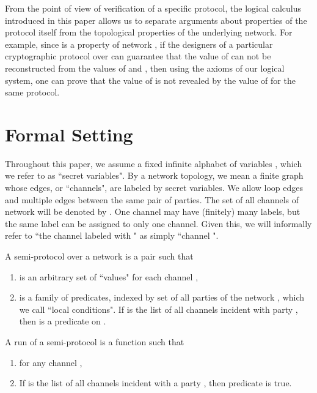 \documentclass{llncs}
\begin{document}
From the point of view of verification of a specific protocol, the logical calculus introduced in this paper allows us to separate arguments about properties of the protocol itself from the topological properties of the underlying network. For example, since  is a property of network , if the designers of a particular cryptographic protocol over  can guarantee that the value of  can not be reconstructed from the values of  and , then using the axioms of our logical system, one can prove that the value of  is not revealed by the value of  for the same protocol.


\section{Formal Setting}

Throughout this paper, we assume a fixed  infinite alphabet of variables , which we refer to as ``secret variables". By a network topology, we mean a finite graph whose edges, or ``channels", are labeled by secret variables.  We allow loop edges and multiple edges between the same pair of parties. The set of all channels of network  will be denoted by .  One channel may have (finitely) many labels, but the same label can be assigned to only one channel. Given this, we will informally refer to ``the channel labeled with " as simply ``channel ". 

\begin{definition}\label{}
A semi-protocol over a network  is a pair  such that
\begin{enumerate}
\item  is an arbitrary set of ``values" for each channel ,
\item  is a family of predicates, indexed by set  of all parties of the network , which we call ``local conditions".  If  is the list of all channels incident with party , then   is a predicate on .
\end{enumerate}
\end{definition}

\begin{definition}\label{}
A run of a semi-protocol  is a function  such that 
\begin{enumerate}
\item  for any channel , 
\item If  is the list of all channels incident with a party , then predicate  is true.
\end{enumerate}
\end{definition}
\end{document}
